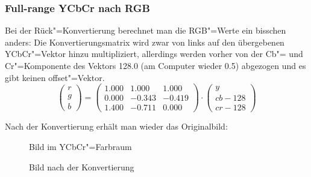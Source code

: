 \documentclass[a4paper,12pt,abstracton,titlepage]{scrartcl}
\begin{document}
\subsubsection{Full-range YCbCr nach RGB}
Bei der Rück"=Konvertierung berechnet man die RGB"=Werte ein bisschen anders: Die Konvertierungsmatrix wird zwar von links auf den übergebenen YCbCr"=Vektor hinzu multipliziert, allerdings werden vorher von der Cb"= und Cr"=Komponente des Vektors 128.0 (am Computer wieder 0.5) abgezogen und es gibt keinen offset"=Vektor. 
\[
    \left(\begin{array}{c} r \\ g \\ b \end{array}\right) =
    \begin{pmatrix} 1.000 & 1.000 & 1.000 \\ 0.000 & -0.343 & -0.419 \\ 1.400 & -0.711 & 0.000
    
    \end{pmatrix}
    \cdot \left(\begin{array}{c} y \\ cb - 128 \\ cr - 128 \end{array}\right)
\]

 
Nach der Konvertierung erhält man wieder das Originalbild:

\begin{figure}[htbp]
\begin{minipage}[t]{0.48\textwidth}
  \begin{center}
    \caption{Bild im YCbCr"=Farbraum}
    \label{ycbcr}
  \end{center}
\end{minipage}
\begin{minipage}[t]{0.52\textwidth}
  \begin{center}
    \caption{Bild nach der Konvertierung}
    \label{ycbcr2rgb}
  \end{center}
\end{minipage}
\end{figure}

\end{document}
